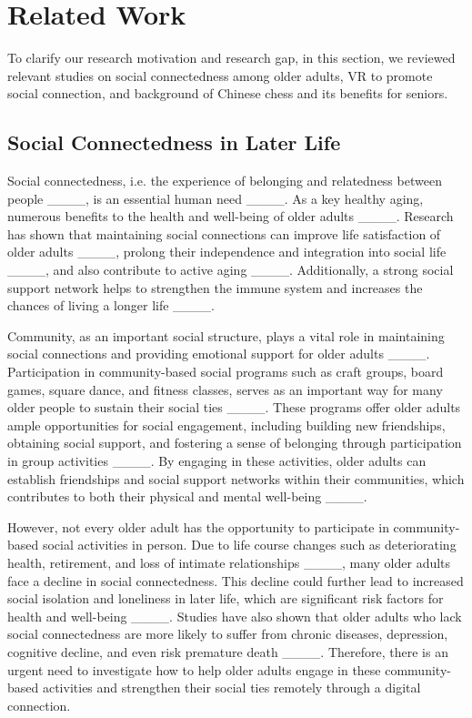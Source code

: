 \section{Related Work}
To clarify our research motivation and research gap, in this section, we reviewed relevant studies on social connectedness among older adults, VR to promote social connection, and background of Chinese chess and its benefits for seniors.

\subsection{Social Connectedness in Later Life}

Social connectedness, i.e. the experience of belonging and relatedness between people ____, is an essential human need ____. As a key  healthy aging,   numerous benefits to the health and well-being of older adults ____. Research has shown that maintaining social connections can improve life satisfaction of older adults ____, prolong their independence and integration into social life ____, and also contribute to active aging ____. Additionally, a strong social support network helps to strengthen the immune system and increases the chances of living a longer life ____.

Community, as an important social structure, plays a vital role in maintaining social connections and providing emotional support for older adults ____. Participation in community-based social programs such as craft groups, board games, square dance, and fitness classes, serves as an important way for many older people to sustain their social ties ____. These programs offer older adults ample opportunities for social engagement, including building new friendships, obtaining social support, and fostering a sense of belonging through participation in group activities ____. By engaging in these activities, older adults can establish friendships and social support networks within their communities, which contributes to both their physical and mental well-being ____.

However, not every older adult has the opportunity to participate in community-based social activities in person. Due to life course changes such as deteriorating health, retirement, and loss of intimate relationships ____, many older adults face a decline in social connectedness. This decline could further lead to increased social isolation and loneliness in later life, which are significant risk factors for health and well-being ____. Studies have also shown that older adults who lack social connectedness are more likely to suffer from chronic diseases, depression, cognitive decline, and even risk premature death ____. Therefore, there is an urgent need to investigate how to help older adults engage in these community-based activities and strengthen their social ties remotely through a digital connection. 

